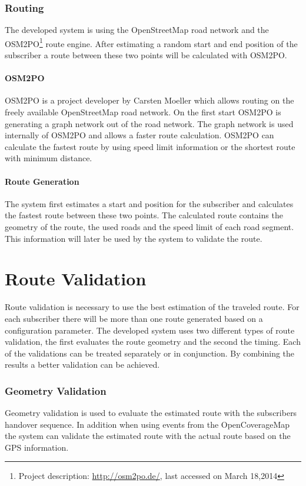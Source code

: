 \subsubsection{Routing}
The developed system is using the OpenStreetMap road network and the OSM2PO\footnote{Project description: \url{http://osm2po.de/}, last accessed on March 18,2014} route engine. After estimating a random start and end position of the subscriber a route between these two points will be calculated with OSM2PO.

\paragraph{OSM2PO}
OSM2PO is a project developer by Carsten Moeller which allows routing on the freely available OpenStreetMap road network. On the first start OSM2PO is generating a graph network out of the road network. The graph network is used internally of OSM2PO and allows a faster route calculation. OSM2PO can calculate the fastest route by using speed limit information or the shortest route with minimum distance.
\paragraph{Route Generation}
The system first estimates a start and position for the subscriber and calculates the fastest route between these two points. The calculated route contains the geometry of the route, the used roads and the speed limit of each road segment. This information will later be used by the system to validate the route.
\section{Route Validation}
\label{sec:routevalidation}
Route validation is necessary to use the best estimation of the traveled route. For each subscriber there will be more than one route generated based on a configuration parameter. The developed system uses two different types of route validation, the first evaluates the route geometry and the second the timing. Each of the validations can be treated separately or in conjunction. By combining the results a better validation can be achieved.
\subsubsection{Geometry Validation}

Geometry validation is used to evaluate the estimated route with the subscribers handover sequence. In addition when using events from the OpenCoverageMap the system can validate the estimated route with the actual route based on the GPS information.
